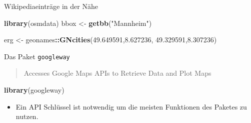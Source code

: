 \documentclass[ignorenonframetext,]{beamer}
\newenvironment{Shaded}{\begin{snugshade}}{\end{snugshade}}
\newcommand{\FloatTok}[1]{\textcolor[rgb]{0.00,0.00,0.81}{#1}}
\newcommand{\KeywordTok}[1]{\textcolor[rgb]{0.13,0.29,0.53}{\textbf{#1}}}
\newcommand{\NormalTok}[1]{#1}
\newcommand{\OperatorTok}[1]{\textcolor[rgb]{0.81,0.36,0.00}{\textbf{#1}}}
\newcommand{\StringTok}[1]{\textcolor[rgb]{0.31,0.60,0.02}{#1}}
\providecommand{\tightlist}{%
  \setlength{\itemsep}{0pt}\setlength{\parskip}{0pt}}
\begin{document}
\begin{frame}[fragile]{Wikipediaeinträge in der Nähe}
\begin{Shaded}
\begin{Highlighting}[]
\KeywordTok{library}\NormalTok{(osmdata)}
\NormalTok{bbox <-}\StringTok{ }\KeywordTok{getbb}\NormalTok{(}\StringTok{"Mannheim"}\NormalTok{)}
\end{Highlighting}
\end{Shaded}

\begin{Shaded}
\begin{Highlighting}[]
\NormalTok{erg <-}\StringTok{ }\NormalTok{geonames}\OperatorTok{::}\KeywordTok{GNcities}\NormalTok{(}\FloatTok{49.649591}\NormalTok{,}\FloatTok{8.627236}\NormalTok{,}
                          \FloatTok{49.329591}\NormalTok{,}\FloatTok{8.307236}\NormalTok{)}
\end{Highlighting}
\end{Shaded}

\end{frame}

\begin{frame}[fragile]{Das Paket \texttt{googleway}}
\protect\hypertarget{das-paket-googleway}{}

\begin{quote}
Accesses Google Maps APIs to Retrieve Data and Plot Maps
\end{quote}

\begin{Shaded}
\begin{Highlighting}[]
\KeywordTok{library}\NormalTok{(googleway)}
\end{Highlighting}
\end{Shaded}

\begin{itemize}
\tightlist
\item
  Ein API Schlüssel ist notwendig um die meisten Funktionen des Paketes
  zu nutzen.
\end{itemize}

\end{frame}
\end{document}
